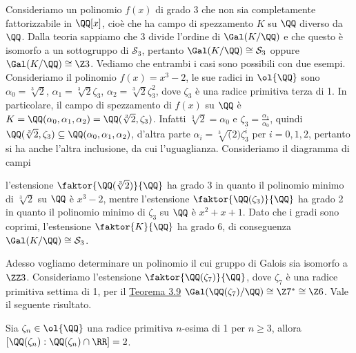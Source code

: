 \documentclass[11pt]{scrartcl}
\begin{document}
Consideriamo un polinomio $f(x)$ di grado 3 che non sia completamente fattorizzabile 
in $\QQ[x]$, cioè che ha campo di spezzamento $K$ 
su $\QQ$ diverso da $\QQ$. Dalla teoria sappiamo che 3 divide l'ordine di 
$\Gal(K/\QQ)$ e che questo è isomorfo a un sottogruppo di 
$\mathcal{S}_3$, pertanto $\Gal(K/\QQ) \cong \mathcal{S}_3$ oppure $\Gal(K/\QQ) \cong \Z3$. 
Vediamo che entrambi i casi sono possibili con due esempi.
\newline
Consideriamo il polinomio $f(x) = x^3 - 2$, le sue radici in $\ol{\QQ}$ sono 
$\alpha_0 = \sqrt[3]{2}$, $\alpha_1 = \sqrt[3]2 \zeta_3$,
$\alpha_2 = \sqrt[3]2\zeta_3^2$, dove $\zeta_3$ è una radice primitiva terza 
di 1. In particolare, il campo di spezzamento di $f(x)$ su $\QQ$
è $K = \QQ(\alpha_0, \alpha_1, \alpha_2) = \QQ(\sqrt[3]2, \zeta_3)$. Infatti 
$\sqrt[3]2 = \alpha_0$ e $\zeta_3 = \frac{\alpha_1}{\alpha_0}$,
quindi $\QQ(\sqrt[3]2, \zeta_3) \subseteq \QQ(\alpha_0, \alpha_1, \alpha_2)$, 
d'altra parte $\alpha_i = \sqrt[3](2)\zeta_3^i$ per 
$i = 0, 1, 2$, pertanto si ha anche l'altra inclusione, da cui l'uguaglianza. 
Consideriamo il diagramma di campi 
\begin{center}
\end{center}
l'estensione $\faktor{\QQ(\sqrt[3]2)}{\QQ}$ ha grado 3 in quanto il 
polinomio minimo di $\sqrt[3]2$ su $\QQ$ è $x^3 - 2$, mentre 
l'estensione $\faktor{\QQ(\zeta_3)}{\QQ}$ ha grado 2 in quanto il polinomio
 minimo di $\zeta_3$ su $\QQ$ è $x^2 + x + 1$. Dato 
che i gradi sono coprimi, l'estensione $\faktor{K}{\QQ}$ ha grado 6, di 
conseguenza $\Gal(K/\QQ) \cong \mathcal{S}_3$.
\newline

Adesso vogliamo determinare un polinomio il cui gruppo di Galois sia 
isomorfo a $\ZZ3$. Consideriamo l'estensione $\faktor{\QQ(\zeta_7)}{\QQ}$,
dove $\zeta_7$ è una radice primitiva settima di 1, per il 
\hyperref[teorema3.9]{Teorema 3.9} $\Gal(\QQ(\zeta_7)/\QQ) \cong \Z7^* \cong \Z6$.
Vale il seguente risultato.

\begin{proposition}
    Sia $\zeta_n \in \ol{\QQ}$ una radice primitiva $n$-esima di 1 per $n \geq 3$,
    allora $[\QQ(\zeta_n):\QQ(\zeta_n)\cap \RR] = 2$.
\end{proposition}
\end{document}
